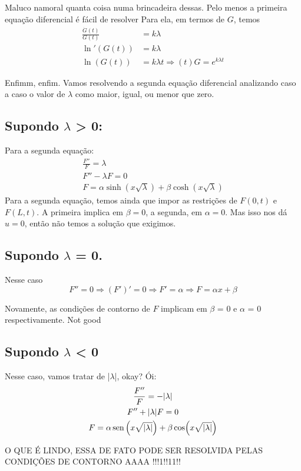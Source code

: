 \documentclass[11pt]{article}
\DeclareMathOperator{\sen}{sen}
\begin{document}
Maluco namoral quanta coisa numa brincadeira dessas. Pelo menos a primeira
equação diferencial é fácil de resolver
Para ela, em termos de \(G\), temos
\begin{align*}
\frac{\dot{G}(t)}{G(t)} &= k\lambda\\
\ln'(G(t)) & = k\lambda \\
\ln(G(t)) &= k\lambda t \Rightarrow (t)G = e^{k\lambda t}   
\end{align*}

Enfimm, enfim. Vamos resolvendo a segunda equação diferencial analizando caso a caso o
valor de \(\lambda\) como maior, igual, ou menor que zero.

\subsection{Supondo \(\lambda\) > 0:}
\label{sec:orgb41e836}

Para a segunda equação:
 \begin{gather*}
  \frac{F''}{F} = \lambda\\
  F'' - \lambda F = 0\\
  F = \alpha \sinh(x\sqrt{\lambda}) + \beta \cosh(x\sqrt{\lambda} )
\end{gather*}
Para a segunda equação, temos ainda que impor as restrições de \(F(0, t)\) e
\(F(L,t)\). A primeira implica em \(\beta = 0\), a segunda, em \(\alpha = 0\). Mas isso
nos dá \(u = 0\), então não temos a solução que exigimos.

\subsection{Supondo \(\lambda\) = 0.}
\label{sec:org873dae9}

Nesse caso
\[
   F'' = 0 \Rightarrow (F')' = 0 \Rightarrow F' = \alpha \Rightarrow F = \alpha x + \beta
   \]

Novamente, as condições de contorno de \(F\) implicam em \(\beta\) = 0 e \(\alpha\) = 0
respectivamente. Not good

\subsection{Supondo \(\lambda\) < 0}
\label{sec:org04627f0}
Nesse caso, vamos tratar de |\(\lambda\)|, okay? Ói:
 \begin{gather*}
  \frac{F''}{F} = -|\lambda|\\
F'' +  |\lambda| F = 0\\
F = \alpha \sen\qty(x\sqrt{|\lambda|}) + \beta \cos(x\sqrt{|\lambda|} )
 \end{gather*}

O QUE É LINDO, ESSA DE FATO PODE SER RESOLVIDA PELAS CONDIÇÕES DE CONTORNO
AAAA !!!1!!11!!
\end{document}

